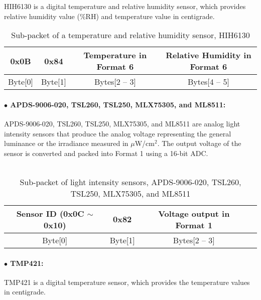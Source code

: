 HIH6130 is a digital temperature and relative humidity sensor, which provides
relative humidity value (\%RH) and temperature value in centigrade.


\begin{table}[h!]
    \centering
    \caption{Sub-packet of a temperature and relative humidity sensor, HIH6130}
    \begin{tabular}{|c|c|c|c|}
        \hline
        \rowcolor{black!8}
        \textbf{0x0B} & \textbf{0x84} & \textbf{Temperature in Format 6} & \textbf{Relative Humidity in Format 6}\\
        \hline
        Byte[0] & Byte[1] & Bytes[2 -- 3] & Bytes[4 -- 5] \\ \hline
    \end{tabular}
\end{table}


\paragraph{$\bullet$ APDS-9006-020, TSL260, TSL250, MLX75305, and ML8511:}

APDS-9006-020, TSL260, TSL250, MLX75305, and ML8511 are analog light intensity sensors that produce the analog voltage 
representing the general luminance or the irradiance measured in $\mu$W/cm$^2$. The output voltage of the sensor
is converted and packed into Format 1 using a 16-bit ADC.
\\\\

\begin{table}[h!]
    \centering
    \caption{Sub-packet of light intensity sensors, APDS-9006-020, TSL260, TSL250, MLX75305, and ML8511}
    \begin{tabular}{|c|c|c|c|}
        \hline
        \rowcolor{black!8}
        \textbf{Sensor ID} (0x0C $\sim$ 0x10) & \textbf{0x82} & \textbf{Voltage output in Format 1}\\
        \hline
        Byte[0] & Byte[1] & Bytes[2 -- 3] \\ \hline
    \end{tabular}
\end{table}



\paragraph{$\bullet$ TMP421:}
TMP421 is a digital temperature sensor, which provides the temperature values
in centigrade.

